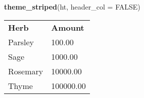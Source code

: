 \documentclass[]{article}
\newenvironment{Shaded}{\begin{snugshade}}{\end{snugshade}}
\newcommand{\KeywordTok}[1]{\textcolor[rgb]{0.13,0.29,0.53}{\textbf{{#1}}}}
\newcommand{\DataTypeTok}[1]{\textcolor[rgb]{0.13,0.29,0.53}{{#1}}}
\newcommand{\OtherTok}[1]{\textcolor[rgb]{0.56,0.35,0.01}{{#1}}}
\newcommand{\NormalTok}[1]{{#1}}
\begin{document}
\FloatBarrier

\begin{Shaded}
\begin{Highlighting}[]
\KeywordTok{theme_striped}\NormalTok{(ht, }\DataTypeTok{header_col =} \OtherTok{FALSE}\NormalTok{)}
\end{Highlighting}
\end{Shaded}

\begin{table}[h]
\begin{centering}\begin{tabularx}{0.5\textwidth}{p{} p{}}
\multicolumn{1}{l}{\cellcolor[RGB]{0, 0, 0} \rule{0pt}{\baselineskip+4pt}\hspace*{4pt}\textbf{\textcolor[RGB]{255, 255, 255}{Herb}}\hspace*{4pt}\rule[-4pt]{0pt}{4pt}} & \multicolumn{1}{l}{\cellcolor[RGB]{0, 0, 0} \rule{0pt}{\baselineskip+4pt}\hspace*{4pt}\textbf{\textcolor[RGB]{255, 255, 255}{Amount}}\hspace*{4pt}\rule[-4pt]{0pt}{4pt}} \tabularnewline[-0.5pt]
\multicolumn{1}{l}{\cellcolor[RGB]{230, 230, 230} \rule{0pt}{\baselineskip+4pt}\hspace*{4pt}Parsley\hspace*{4pt}\rule[-4pt]{0pt}{4pt}} & \multicolumn{1}{l}{\cellcolor[RGB]{230, 230, 230} \rule{0pt}{\baselineskip+4pt}\hspace*{4pt}100.00\hspace*{4pt}\rule[-4pt]{0pt}{4pt}} \tabularnewline[-0.5pt]
\multicolumn{1}{l}{\cellcolor[RGB]{255, 255, 255} \rule{0pt}{\baselineskip+4pt}\hspace*{4pt}Sage\hspace*{4pt}\rule[-4pt]{0pt}{4pt}} & \multicolumn{1}{l}{\cellcolor[RGB]{255, 255, 255} \rule{0pt}{\baselineskip+4pt}\hspace*{4pt}1000.00\hspace*{4pt}\rule[-4pt]{0pt}{4pt}} \tabularnewline[-0.5pt]
\multicolumn{1}{l}{\cellcolor[RGB]{230, 230, 230} \rule{0pt}{\baselineskip+4pt}\hspace*{4pt}Rosemary\hspace*{4pt}\rule[-4pt]{0pt}{4pt}} & \multicolumn{1}{l}{\cellcolor[RGB]{230, 230, 230} \rule{0pt}{\baselineskip+4pt}\hspace*{4pt}10000.00\hspace*{4pt}\rule[-4pt]{0pt}{4pt}} \tabularnewline[-0.5pt]
\multicolumn{1}{l}{\cellcolor[RGB]{255, 255, 255} \rule{0pt}{\baselineskip+4pt}\hspace*{4pt}Thyme\hspace*{4pt}\rule[-4pt]{0pt}{4pt}} & \multicolumn{1}{l}{\cellcolor[RGB]{255, 255, 255} \rule{0pt}{\baselineskip+4pt}\hspace*{4pt}100000.00\hspace*{4pt}\rule[-4pt]{0pt}{4pt}} \tabularnewline[-0.5pt]
\end{tabularx}
\par\end{centering}
\end{table}
\end{document}
